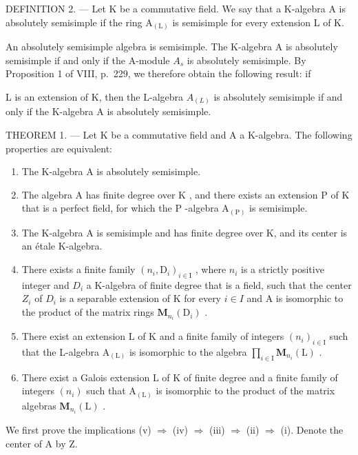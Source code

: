DEFINITION 2. --- Let K be a commutative field. We say that a K-algebra A is absolutely semisimple if the ring \(\mathrm{A}_{(\mathrm{L})}\) is semisimple for every extension L of K.

An absolutely semisimple algebra is semisimple. The K-algebra A is absolutely semisimple if and only if the A-module \(A_{s}\) is absolutely semisimple. By Proposition 1 of VIII, p.~229, we therefore obtain the following result: if

L is an extension of K, then the L-algebra \(A_{(L)}\) is absolutely semisimple if and only if the K-algebra A is absolutely semisimple.

THEOREM 1. --- Let K be a commutative field and A a K-algebra. The following properties are equivalent:

\begin{enumerate}
\def\labelenumi{(\roman{enumi})}
\item
  The K-algebra A is absolutely semisimple.
\item
  The algebra \(\mathrm{A}\) has finite degree over \(\mathrm{K}\) , and there exists an extension \(\mathrm{P}\) of \(\mathrm{K}\) that is a perfect field, for which the \(\mathrm{P}\) -algebra \(\mathrm{A}_{(\mathrm{P})}\) is semisimple.
\item
  The K-algebra A is semisimple and has finite degree over K, and its center is an étale K-algebra.
\item
  There exists a finite family \((n_{i},\mathrm{D}_{i})_{i\in\mathrm{I}}\) , where \(n_{i}\) is a strictly positive integer and \(D_{i}\) a K-algebra of finite degree that is a field, such that the center \(Z_{i}\) of \(D_{i}\) is a separable extension of K for every \(i\in I\) and A is isomorphic to the product of the matrix rings \(\mathbf{M}_{n_{i}}(\mathrm{D}_{i})\) .
\item
  There exist an extension \(\mathrm{L}\) of \(\mathrm{K}\) and a finite family of integers \((n_i)_{i\in \mathrm{I}}\) such that the L-algebra \(\mathrm{A}_{(\mathrm{L})}\) is isomorphic to the algebra \(\prod_{i\in \mathrm{I}}\mathbf{M}_{n_i}(\mathrm{L})\) .
\item
  There exist a Galois extension L of K of finite degree and a finite family of integers \((n_{i})\) such that \(\mathrm{A}_{(\mathrm{L})}\) is isomorphic to the product of the matrix algebras \(\mathbf{M}_{n_{i}}(\mathrm{L})\) .
\end{enumerate}

We first prove the implications (v) \(\Rightarrow\) (iv) \(\Rightarrow\) (iii) \(\Rightarrow\) (ii) \(\Rightarrow\) (i). Denote the center of A by Z.

